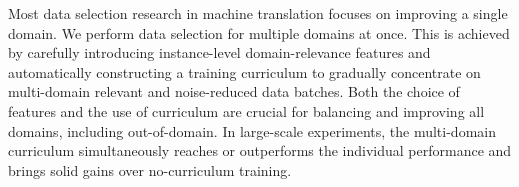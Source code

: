Most data selection research in machine translation focuses on improving a single domain. We perform data selection for multiple domains at once. This is achieved by carefully introducing instance-level domain-relevance features and automatically constructing a training curriculum to gradually concentrate on multi-domain relevant and noise-reduced data batches. Both the choice of features and the use of curriculum are crucial for balancing and improving all domains, including out-of-domain. In large-scale experiments, the multi-domain curriculum simultaneously reaches or outperforms the individual performance and brings solid gains over no-curriculum training.
